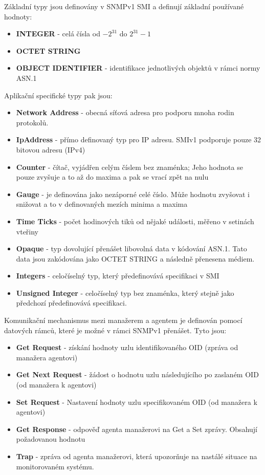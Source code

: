 Základní typy jsou definovány v SNMPv1 SMI a definují základní používané hodnoty:
\begin{itemize}
	\item \textbf{INTEGER} - celá čísla od $ -2^{31} $ do $ 2^{31}-1$
	\item \textbf{OCTET STRING}
	\item \textbf{OBJECT IDENTIFIER} - identifikace jednotlivých objektů v rámci normy ASN.1
\end{itemize}

Aplikační specifické typy pak jsou:
\begin{itemize}
	\item \textbf{Network Address} - obecná síťová adresa pro podporu mnoha rodin protokolů.
	\item \textbf{IpAddress} - přímo definovaný typ pro IP adresu. SMIv1 podporuje pouze 32 bitovou adresu (IPv4)
	\item \textbf{Counter} - čítač, vyjádřen celým číslem bez znaménka; Jeho hodnota se pouze zvyšuje a to až do maxima a pak se vrací zpět na nulu
	\item \textbf{Gauge} - je definována jako nezáporné celé číslo. Může hodnotu zvyšovat i snižovat a to v definovaných mezích minima a maxima
	\item \textbf{Time Ticks} - počet hodinových tiků od nějaké události, měřeno v setinách vteřiny
	\item \textbf{Opaque} - typ dovolující přenášet libovolná data v kódování ASN.1. Tato data jsou zakódována jako OCTET STRING a následně přenesena médiem.
	\item \textbf{Integers} - celočíselný typ, který předefinovává specifikaci v SMI
	\item \textbf{Unsigned Integer} - celočíselný typ bez znaménka, který stejně jako předchozí předefinovává specifikaci.
\end{itemize}

Komunikační mechanismus mezi manažerem a agentem je definován pomocí datových rámců, které je možné v rámci SNMPv1 přenášet. Tyto jsou:
\begin{itemize}
	\item \textbf{Get Request} - získání hodnoty uzlu identifikovaného OID (zpráva od manažera agentovi)
	\item \textbf{Get Next Request} - žádost o hodnotu uzlu následujícího po zaslaném OID (od manažera k agentovi)
	\item \textbf{Set Request} - Nastavení hodnoty uzlu specifikovaném OID (od manažera k agentovi) 
	\item \textbf{Get Response} - odpověď agenta manažerovi na Get a Set zprávy. Obsahují požadovanou hodnotu
	\item \textbf{Trap} - zpráva od agenta manažerovi, která upozorňuje na nastálé situace na monitorovaném systému.
\end{itemize}

